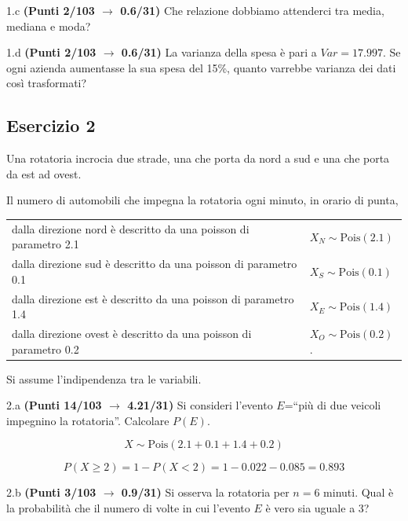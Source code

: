 \documentclass[
  11pt,
]{book}
\theoremstyle{mytheoremstyle}
\theoremstyle{mydefstyle}
\newenvironment{sol}
  {
  \begin{tcolorbox}[enhanced,breakable,arc=0.1mm,boxrule=1pt,colback=white,colframe=iblue,
  title=\bf \fontfamily{lmss}\selectfont \hspace{.5 cm} Soluzione,drop fuzzy shadow]

}{
\end{tcolorbox}
  }
\begin{document}
1.c \textbf{(Punti 2/103 \(\rightarrow\) 0.6/31)} Che relazione dobbiamo attenderci tra media, mediana e moda?

1.d \textbf{(Punti 2/103 \(\rightarrow\) 0.6/31)} La varianza della spesa è pari a \(Var=17.997\).
Se ogni azienda aumentasse la sua spesa del 15\%, quanto varrebbe varianza dei dati così trasformati?

\subsection{Esercizio 2}\label{esercizio-2-15}

Una rotatoria incrocia due strade, una che porta da nord a sud e una che porta da est ad ovest.

Il numero di automobili che impegna la rotatoria ogni minuto, in orario di punta,

\begin{longtable}[]{@{}
  >{\raggedright\arraybackslash}p{}
  >{\raggedright\arraybackslash}p{}@{}}
\toprule\noalign{}
\endhead
\bottomrule\noalign{}
\endlastfoot
dalla direzione nord è descritto da una poisson di parametro 2.1 & \(X_N\sim\text{Pois}(2.1)\) \\
dalla direzione sud è descritto da una poisson di parametro 0.1 & \(X_S\sim\text{Pois}(0.1)\) \\
dalla direzione est è descritto da una poisson di parametro 1.4 & \(X_E\sim\text{Pois}(1.4)\) \\
dalla direzione ovest è descritto da una poisson di parametro 0.2 & \(X_O\sim\text{Pois}(0.2)\). \\
\end{longtable}

Si assume l'indipendenza tra le variabili.

2.a \textbf{(Punti 14/103 \(\rightarrow\) 4.21/31)} Si consideri l'evento \(E\)=``più di due veicoli impegnino la rotatoria''. Calcolare \(P(E)\).

\begin{sol}
\[
X\sim\text{Pois}(2.1+0.1+1.4+0.2)
\]

\[P(X\ge 2) = 1-P(X<2)=1-0.022-0.085= 0.893\]

\end{sol}

2.b \textbf{(Punti 3/103 \(\rightarrow\) 0.9/31)} Si osserva la rotatoria per \(n=6\) minuti. Qual è
la probabilità che il numero di volte in cui l'evento \(E\) è vero sia uguale a 3?
\end{document}
